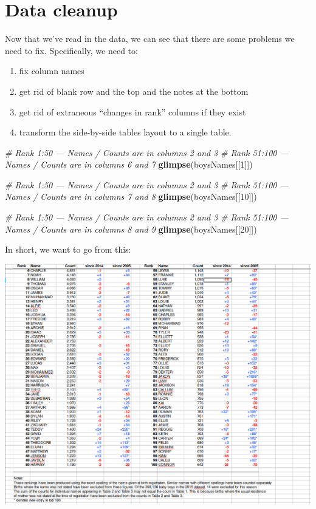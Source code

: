 \documentclass[]{book}
\newenvironment{Shaded}{\begin{snugshade}}{\end{snugshade}}
\newcommand{\KeywordTok}[1]{\textcolor[rgb]{0.13,0.29,0.53}{\textbf{#1}}}
\newcommand{\DecValTok}[1]{\textcolor[rgb]{0.00,0.00,0.81}{#1}}
\newcommand{\CommentTok}[1]{\textcolor[rgb]{0.56,0.35,0.01}{\textit{#1}}}
\newcommand{\NormalTok}[1]{#1}
\providecommand{\tightlist}{%
  \setlength{\itemsep}{0pt}\setlength{\parskip}{0pt}}
\begin{document}
\section{Data cleanup}\label{data-cleanup}

Now that we've read in the data, we can see that there are some problems
we need to fix. Specifically, we need to:

\begin{enumerate}
\def\labelenumi{\arabic{enumi}.}
\tightlist
\item
  fix column names
\item
  get rid of blank row and the top and the notes at the bottom
\item
  get rid of extraneous ``changes in rank'' columns if they exist
\item
  transform the side-by-side tables layout to a single table.
\end{enumerate}

\begin{Shaded}
\begin{Highlighting}[]
\CommentTok{# Rank 1:50 --- Names / Counts are in columns 2 and 3 }
\CommentTok{# Rank 51:100 --- Names / Counts are in columns 6 and 7}
\KeywordTok{glimpse}\NormalTok{(boysNames[[}\DecValTok{1}\NormalTok{]]) }

\CommentTok{# Rank 1:50 --- Names / Counts are in columns 2 and 3 }
\CommentTok{# Rank 51:100 --- Names / Counts are in columns 7 and 8}
\KeywordTok{glimpse}\NormalTok{(boysNames[[}\DecValTok{10}\NormalTok{]]) }

\CommentTok{# Rank 1:50 --- Names / Counts are in columns 2 and 3 }
\CommentTok{# Rank 51:100 --- Names / Counts are in columns 8 and 9}
\KeywordTok{glimpse}\NormalTok{(boysNames[[}\DecValTok{20}\NormalTok{]]) }
\end{Highlighting}
\end{Shaded}

In short, we want to go from this:

\includegraphics{R/RDataWrangling/images/messy.png}
\end{document}
